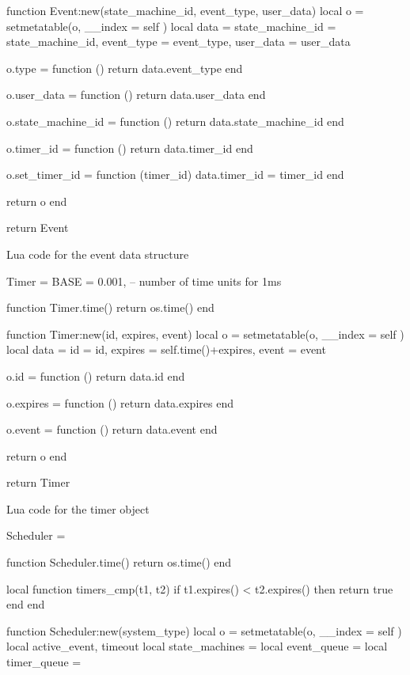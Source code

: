 \begin{appendices}
\begin{listing}[H]
\begin{luacode}
function Event:new(state_machine_id, event_type, user_data)
	local o = {}
	setmetatable(o, { __index = self })
	local data = {state_machine_id = state_machine_id,
	              event_type = event_type, user_data = user_data}
	
	o.type = function ()
		return data.event_type
	end

	o.user_data = function ()
		return data.user_data
	end

	o.state_machine_id = function ()
		return data.state_machine_id
	end

	o.timer_id = function ()
		return data.timer_id
	end

	o.set_timer_id = function (timer_id)
		data.timer_id = timer_id
	end

	return o
end

return Event
\end{luacode}
	\caption{Lua code for the event data structure }
	\label{code:event}
\end{listing}

\begin{listing}[H]
\begin{luacode}
Timer = {
	BASE = 0.001, -- number of time units for 1ms
}

function Timer.time()
	return os.time()
end

function Timer:new(id, expires, event)
	local o = {}
	setmetatable(o, { __index = self })
	local data = {id = id, expires = self.time()+expires, event = event}

	o.id = function ()
		return data.id
	end

	o.expires = function ()
		return data.expires
	end

	o.event = function ()
		return data.event
	end
	
	return o
end

return Timer
\end{luacode}
	\caption{Lua code for the timer object }
	\label{code:timer}
\end{listing}

\begin{listing}[H]
\begin{luacode}
Scheduler = {}

function Scheduler.time()
	return os.time()
end

local function timers_cmp(t1, t2)
	if t1.expires() < t2.expires() then return true end
end

function Scheduler:new(system_type)
	local o = {}
	setmetatable(o, { __index = self })
	local active_event, timeout
	local state_machines = {}
	local event_queue = {}
	local timer_queue = {}


\end{luacode}
\end{listing}
\end{appendices}
